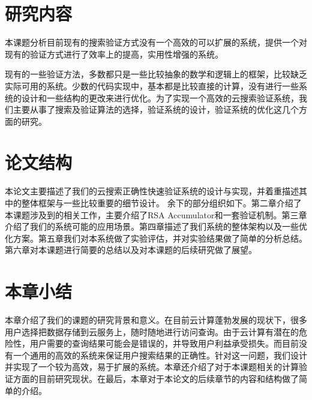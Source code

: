 \section{研究内容}
本课题分析目前现有的搜索验证方式没有一个高效的可以扩展的系统，提供一个对现有的验证方式进行了效率上的提高，实用性增强的系统。

现有的一些验证方法，多数都只是一些比较抽象的数学和逻辑上的框架，比较缺乏实际可用的系统。少数的代码实现中，基本都是比较直接的计算，没有进行一些系统的设计和一些结构的更改来进行优化。为了实现一个高效的云搜索验证系统，我们主要从事了搜索及验证算法的选择，验证系统的设计，验证系统的优化这几个方面的研究。

\section{论文结构}
本论文主要描述了我们的云搜索正确性快速验证系统的设计与实现，并着重描述其中的整体框架与一些比较重要的细节设计。
余下的部分组织如下。第二章介绍了本课题涉及到的相关工作，主要介绍了RSA Accumulator和一套验证机制。第三章介绍了我们的系统可能的应用场景。第四章描述了我们系统的整体架构以及一些优化方案。第五章我们对本系统做了实验评估，并对实验结果做了简单的分析总结。第六章对本课题进行简要的总结以及对本课题的后续研究做了展望。

\section{本章小结}
本章介绍了我们的课题的研究背景和意义。在目前云计算蓬勃发展的现状下，很多用户选择把数据存储到云服务上，随时随地进行访问查询。由于云计算有潜在的危险性，用户需要的查询结果可能会是错误的，并导致用户利益承受损失。而目前没有一个通用的高效的系统来保证用户搜索结果的正确性。针对这一问题，我们设计并实现了一个较为高效，易于扩展的系统。本章还介绍了对于本课题相关的计算验证方面的目前研究现状。在最后，本章对于本论文的后续章节的内容和结构做了简单的介绍。
